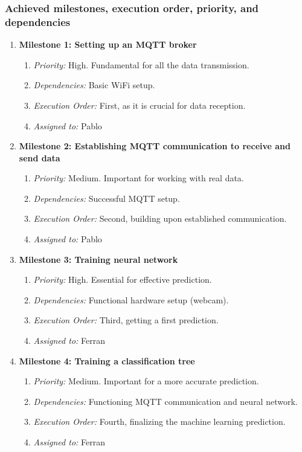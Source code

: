 \subsubsection{Achieved milestones, execution order, priority, and dependencies}
\begin{enumerate}
    \item \textbf{Milestone 1: Setting up an MQTT broker}
        \begin{enumerate}
            \item \textit{Priority:} High. Fundamental for all the data transmission.
            \item \textit{Dependencies:} Basic WiFi setup.
            \item \textit{Execution Order:} First, as it is crucial for data reception.
            \item \textit{Assigned to:} Pablo
        \end{enumerate}

    \item \textbf{Milestone 2: Establishing MQTT communication to receive and send data}
        \begin{enumerate}
            \item \textit{Priority:} Medium. Important for working with real data.
            \item \textit{Dependencies:} Successful MQTT setup.
            \item \textit{Execution Order:} Second, building upon established communication.
            \item \textit{Assigned to:} Pablo
        \end{enumerate}

    \item \textbf{Milestone 3: Training neural network}
        \begin{enumerate}
            \item \textit{Priority:} High. Essential for effective prediction.
            \item \textit{Dependencies:} Functional hardware setup (webcam).
            \item \textit{Execution Order:} Third, getting a first prediction.
            \item \textit{Assigned to:} Ferran
        \end{enumerate}

    \item \textbf{Milestone 4: Training a classification tree}
        \begin{enumerate}
            \item \textit{Priority:} Medium. Important for a more accurate prediction.
            \item \textit{Dependencies:} Functioning MQTT communication and neural network.
            \item \textit{Execution Order:} Fourth, finalizing the machine learning prediction.
            \item \textit{Assigned to:} Ferran
        \end{enumerate}


\end{enumerate}
